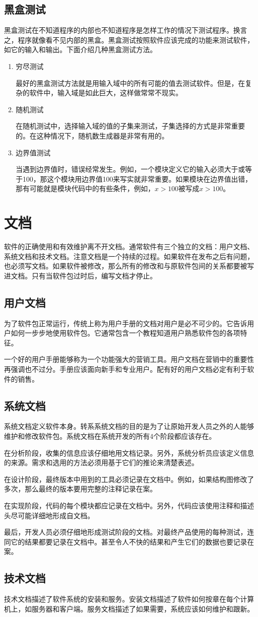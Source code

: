 \subsection{黑盒测试}
黑盒测试在不知道程序的内部也不知道程序是怎样工作的情况下测试程序。换言之，程序就像看不见内部的黑盒。黑盒测试按照软件应该完成的功能来测试软件，如它的输入和输出。下面介绍几种黑盒测试方法。
\begin{enumerate}
	\item 穷尽测试

	最好的黑盒测试方法就是用输入域中的所有可能的值去测试软件。但是，在复杂的软件中，输入域是如此巨大，这样做常常不现实。
	\item 随机测试

	在随机测试中，选择输入域的值的子集来测试，子集选择的方式是非常重要的。在这种情况下，随机数生成器是非常有用的。
	\item 边界值测试

	当遇到边界值时，错误经常发生。例如，一个模块定义它的输入必须大于或等于100，那这个模块用边界值100来写实就非常重要。如果模块在边界值出错，那有可能就是模块代码中的有些条件，例如，$x>100$被写成$x>100$。
\end{enumerate}
\section{文档}
软件的正确使用和有效维护离不开文档。通常软件有三个独立的文档：用户文档、系统文档和技术文档。注意文档是一个持续的过程。如果软件在发布之后有问题，也必须写文档。如果软件被修改，那么所有的修改和与原软件包间的关系都要被写进文档。只有当软件包过时后，编写文档才停止。
\subsection{用户文档}
为了软件包正常运行，传统上称为用户手册的文档对用户是必不可少的。它告诉用户如何一步步地使用软件包。它通常包含一个教程知道用户熟悉软件包的各项特征。

一个好的用户手册能够称为一个功能强大的营销工具。用户文档在营销中的重要性再强调也不过分。手册应该面向新手和专业用户。配有好的用户文档必定有利于软件的销售。
\subsection{系统文档}
系统文档定义软件本身。转系系统文档的目的是为了让原始开发人员之外的人能够维护和修改软件包。系统文档在系统开发的所有4个阶段都应该存在。

在分析阶段，收集的信息应该仔细地用文档记录。另外，系统分析员应该定义信息的来源。需求和选用的方法必须用基于它们的推论来清楚表述。

在设计阶段，最终版本中用到的工具必须记录在文档中。例如，如果结构图修改了多次，那么最终的版本要用完整的注释记录在案。

在实现阶段，代码的每个模块都应记录在文档中。另外，代码应该使用注释和描述头尽可能详细地形成自文档。

最后，开发人员必须仔细地形成测试阶段的文档。对最终产品使用的每种测试，连同它的结果都要记录在文档中。甚至令人不快的结果和产生它们的数据也要记录在案。
\subsection{技术文档}
技术文档描述了软件系统的安装和服务。安装文档描述了软件如何按章在每个计算机上，如服务器和客户端。服务文档描述了如果需要，系统应该如何维护和跟新。
